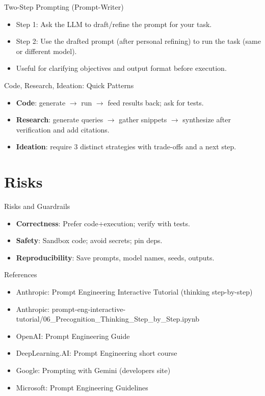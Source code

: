 \documentclass[aspectratio=169]{beamer}
\begin{document}
\begin{frame}{Two-Step Prompting (Prompt-Writer)}
  \begin{itemize}
    \item Step 1: Ask the LLM to draft/refine the prompt for your task.
    \item Step 2: Use the drafted prompt (after personal refining) to run the task (same or different model).
    \item Useful for clarifying objectives and output format before execution.
  \end{itemize}
\end{frame}

\begin{frame}{Code, Research, Ideation: Quick Patterns}
  \begin{itemize}
    \item \textbf{Code}: generate \(\rightarrow\) run \(\rightarrow\) feed results back; ask for tests.
    \item \textbf{Research}: generate queries \(\rightarrow\) gather snippets \(\rightarrow\) synthesize after verification and add citations.
    \item \textbf{Ideation}: require 3 distinct strategies with trade-offs and a next step.
  \end{itemize}
\end{frame}


\section{Risks}

\begin{frame}{Risks and Guardrails}
  \begin{itemize}
    \item \textbf{Correctness}: Prefer code+execution; verify with tests.
    \item \textbf{Safety}: Sandbox code; avoid secrets; pin deps.
    \item \textbf{Reproducibility}: Save prompts, model names, seeds, outputs.
  \end{itemize}
\end{frame}

\begin{frame}{References}
  \begin{itemize}
    \item Anthropic: Prompt Engineering Interactive Tutorial (thinking step-by-step)
    \item Anthropic: prompt-eng-interactive-tutorial/06\_Precognition\_Thinking\_Step\_by\_Step.ipynb
    \item OpenAI: Prompt Engineering Guide
    \item DeepLearning.AI: Prompt Engineering short course
    \item Google: Prompting with Gemini (developers site)
    \item Microsoft: Prompt Engineering Guidelines
  \end{itemize}
\end{frame}
\end{document}
